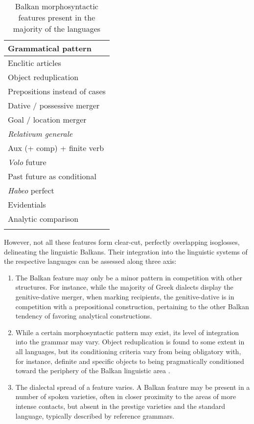 \documentclass[output=paper,
modfonts
]{langscibook}
\begin{document}
\begin{table}
\caption{Balkan morphosyntactic features present in the majority of the languages \parencite[adapted from][]{lindstedt00}}  
\label{tab-balkans}
 \begin{tabular}{p{9cm}} 
  \lsptoprule
  Grammatical pattern\\ 
  \midrule
Enclitic articles \\
Object reduplication \\
Prepositions instead of cases \\
Dative / possessive merger \\
Goal / location merger \\
\textit{Relativum generale} \\
Aux (+ comp) + finite verb \\
\textit{Volo} future \\
Past future as conditional \\
\textit{Habeo} perfect \\
Evidentials \\
Analytic comparison \\
  \lspbottomrule
 \end{tabular}
\end{table}

\noindent However, not all these features form clear-cut, perfectly overlapping isoglosses, delineating the linguistic Balkans. Their integration into the linguistic systems of the respective languages can be assessed along three axis:

\begin{enumerate}
\setlength{\itemsep}{0.0\baselineskip}
\item The Balkan feature may only be a minor pattern in competition with other structures. For instance, while the majority of Greek dialects display the genitive-dative merger, when marking recipients, the genitive-dative is in competition with a prepositional construction, pertaining to the other Balkan tendency of favoring analytical constructions.
\item While a certain morphosyntactic pattern may exist, its level of integration into the grammar may vary. Object reduplication is found to some extent in all languages, but its conditioning criteria vary from being obligatory with, for instance, definite and specific objects to being pragmatically conditioned toward the periphery of the Balkan linguistic area \parencite{friedman2008}.
\item The dialectal spread of a feature varies. A Balkan feature may be present in a number of spoken varieties, often in closer proximity to the areas of more intense contacts, but absent in the prestige varieties and the standard language, typically described by reference grammars.
\end{enumerate}
\end{document}
